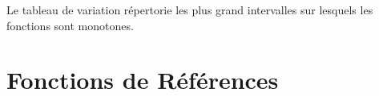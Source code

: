 \documentclass{poly}
\begin{document}
\vspace*{0.5cm}
\begin{definition}
Le tableau de variation répertorie les plus grand intervalles sur lesquels les fonctions sont monotones. 
\end{definition}
\begin{example}
\hfill

\vspace*{0.2cm}
\begin{minipage}{0.45\textwidth}
\end{minipage}
\hfill\vline\hfill
\begin{minipage}{0.45\textwidth}
\end{minipage}
\end{example}

\newpage
\section{Fonctions de Références}
\end{document}
